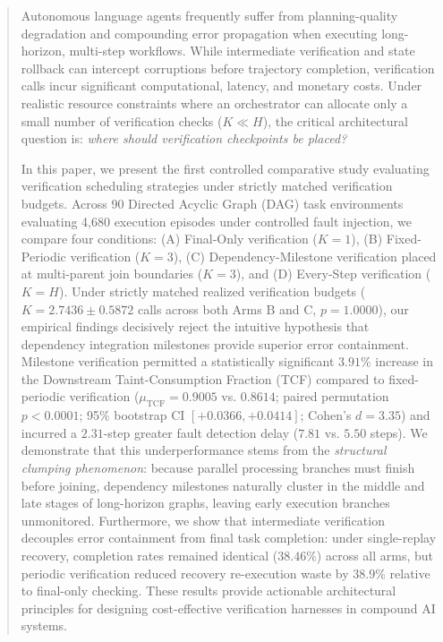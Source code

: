 \begin{abstract}
Autonomous language agents frequently suffer from planning-quality degradation and compounding error propagation when executing long-horizon, multi-step workflows. While intermediate verification and state rollback can intercept corruptions before trajectory completion, verification calls incur significant computational, latency, and monetary costs. Under realistic resource constraints where an orchestrator can allocate only a small number of verification checks ($K \ll H$), the critical architectural question is: \emph{where should verification checkpoints be placed?}

In this paper, we present the first controlled comparative study evaluating verification scheduling strategies under strictly matched verification budgets. Across 90 Directed Acyclic Graph (DAG) task environments evaluating 4,680 execution episodes under controlled fault injection, we compare four conditions: (A) Final-Only verification ($K=1$), (B) Fixed-Periodic verification ($K=3$), (C) Dependency-Milestone verification placed at multi-parent join boundaries ($K=3$), and (D) Every-Step verification ($K=H$). Under strictly matched realized verification budgets ($K=2.7436 \pm 0.5872$ calls across both Arms B and C, $p = 1.0000$), our empirical findings decisively reject the intuitive hypothesis that dependency integration milestones provide superior error containment. Milestone verification permitted a statistically significant $3.91\%$ increase in the Downstream Taint-Consumption Fraction (TCF) compared to fixed-periodic verification ($\mu_{\text{TCF}} = 0.9005$ vs. $0.8614$; paired permutation $p < 0.0001$; 95\% bootstrap CI $[+0.0366, +0.0414]$; Cohen's $d = 3.35$) and incurred a $2.31$-step greater fault detection delay ($7.81$ vs. $5.50$ steps). We demonstrate that this underperformance stems from the \emph{structural clumping phenomenon}: because parallel processing branches must finish before joining, dependency milestones naturally cluster in the middle and late stages of long-horizon graphs, leaving early execution branches unmonitored. Furthermore, we show that intermediate verification decouples error containment from final task completion: under single-replay recovery, completion rates remained identical ($38.46\%$) across all arms, but periodic verification reduced recovery re-execution waste by $38.9\%$ relative to final-only checking. These results provide actionable architectural principles for designing cost-effective verification harnesses in compound AI systems.
\end{abstract}
